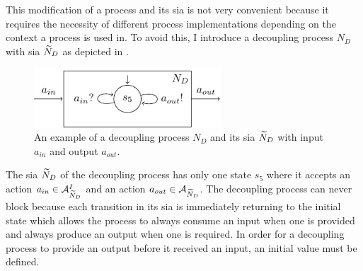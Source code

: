 This modification of a process and its \gls{sia} is not very convenient because it requires the necessity of different process implementations depending on the context a process is used in.
To avoid this, I introduce a decoupling process $N_D$ with \gls{sia} $\widetilde{N}_D$ as depicted in \Fig{\ref{fig_sia_decoupler}}.
\begin{figure}[bht]
    \TopFigSpace
    \centering
    \includegraphics[width=7cm]{fig/sia_decoupler.pdf}
    \CaptionFigSpace
    \caption{An example of a decoupling process $N_D$ and its \gls{sia} $\widetilde{N}_D$ with input $a_{in}$ and output $a_{out}$.}
    \label{fig_sia_decoupler}
    \BotFigSpace
\end{figure}
The \gls{sia} $\widetilde{N}_D$ of the decoupling process has only one state $s_5$ where it accepts an action $a_{in} \in \mathcal{A}_{\widetilde{N}_D}^I$ and an action $a_{out} \in \mathcal{A}_{\widetilde{N}_D}$.
The decoupling process can never block because each transition in its \gls{sia} is immediately returning to the initial state which allows the process to always consume an input when one is provided and always produce an output when one is required.
In order for a decoupling process to provide an output before it received an input, an initial value must be defined.


